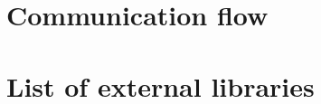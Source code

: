\documentclass[Report.tex]{subfiles}
\begin{document}
\nocite{*} %
\printbibliography%
\clearpage

\begin{appendices}
\chapter{Communication flow}
  
\clearpage
\chapter{List of external libraries}
  \label{sec:libraries}
  
\end{appendices}
\end{document}
